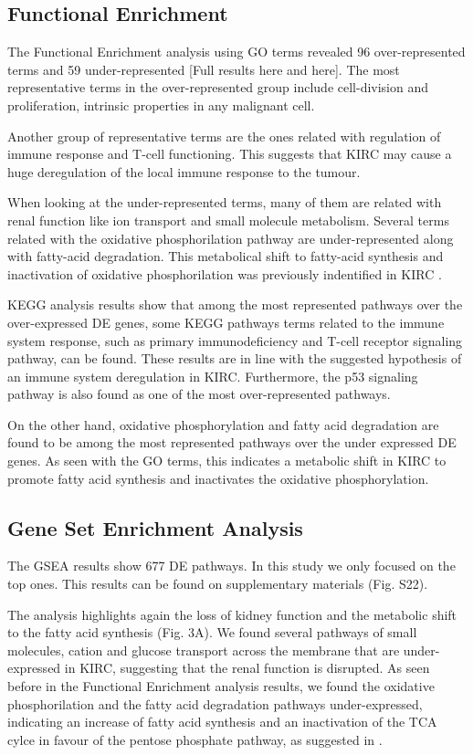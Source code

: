 \documentclass[9pt,twocolumn,twoside]{gsajnl}
\begin{document}
\subsection*{Functional Enrichment}
The Functional Enrichment analysis using GO terms revealed 96 over-represented terms and 59 under-represented [Full results here and here]. The most representative terms in the over-represented group include cell-division and proliferation, intrinsic properties in any malignant cell. 

Another group of representative terms are the ones related with regulation of immune response and T-cell functioning. This suggests that KIRC may cause a huge deregulation of the local immune response to the tumour. 

When looking at the under-represented terms, many of them are related with renal function like ion transport and small molecule metabolism. Several terms related with the oxidative phosphorilation pathway are under-represented along with fatty-acid degradation. This metabolical shift to fatty-acid synthesis and inactivation of oxidative phosphorilation was previously indentified in KIRC \citep{Creighton2013}.

KEGG analysis results show that among the most represented pathways over the over-expressed DE genes, some KEGG pathways terms related to the immune system response, such as primary immunodeficiency and T-cell receptor signaling pathway, can be found.  These results are in line with the suggested hypothesis of an immune system deregulation in KIRC. Furthermore, the p53 signaling pathway is also found as one of the most over-represented pathways.

On the other hand, oxidative phosphorylation and fatty acid degradation are found to be among the most represented pathways over the under expressed DE genes. As seen with the GO terms, this indicates a metabolic shift in KIRC to promote fatty acid synthesis and inactivates the oxidative phosphorylation.

\subsection*{Gene Set Enrichment Analysis}
The GSEA results show 677 DE pathways. In this study we only focused on the top ones. This results can be found on supplementary materials (Fig. S22).

The analysis highlights again the loss of kidney function and the metabolic shift to the fatty acid synthesis  (Fig. 3A). We found several pathways of small molecules, cation and glucose transport across the membrane that are under-expressed in KIRC, suggesting that the renal function is disrupted. As seen before in the Functional Enrichment analysis results, we found the oxidative phosphorilation and the fatty acid degradation pathways under-expressed, indicating an increase of fatty acid synthesis and  an inactivation of the TCA cylce in favour of the pentose phosphate pathway, as suggested in \citep{Creighton2013}. 
\end{document}
